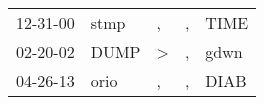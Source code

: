 \begin{supertabular}{p{0.07\textwidth}p{0.06\textwidth}p{0.02\textwidth}p{0.02\textwidth}p{0.06\textwidth}}
 12-31-00\textsuperscript{} &  stmp\textsuperscript{} &             , &  , &  TIME\textsuperscript{} \\
 02-20-02\textsuperscript{} &  DUMP\textsuperscript{} &  \textgreater &  , &  gdwn\textsuperscript{} \\
 04-26-13\textsuperscript{} &  orio\textsuperscript{} &             , &  , &  DIAB\textsuperscript{} \\
\end{supertabular}
